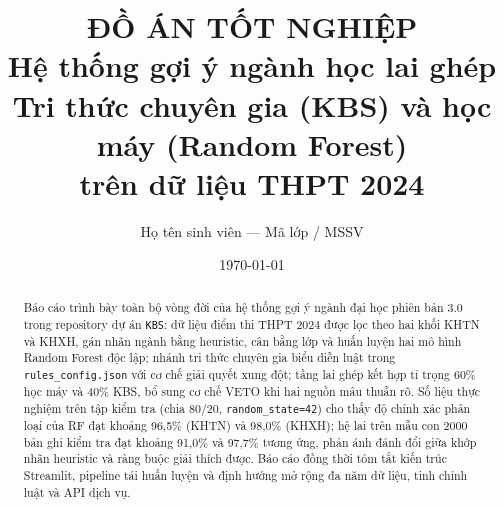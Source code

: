 \documentclass[12pt,a4paper]{report}
\title{\textbf{ĐỒ ÁN TỐT NGHIỆP}\\[0.8em]
\Large Hệ thống gợi ý ngành học lai ghép\\[0.3em]
\normalsize Tri thức chuyên gia (KBS) và học máy (Random Forest)\\trên dữ liệu THPT 2024}
\author{Họ tên sinh viên --- Mã lớp / MSSV}
\date{\today}
\begin{document}
\onehalfspacing

\maketitle
\setcounter{page}{1}


{}
\begin{abstract}
Báo cáo trình bày toàn bộ vòng đời của hệ thống gợi ý ngành đại học phiên bản 3.0 trong repository dự án \texttt{KBS}: dữ liệu điểm thi THPT 2024 được lọc theo hai khối KHTN và KHXH, gán nhãn ngành bằng heuristic, cân bằng lớp và huấn luyện hai mô hình Random Forest độc lập; nhánh tri thức chuyên gia biểu diễn luật trong \texttt{rules\_config.json} với cơ chế giải quyết xung đột; tầng lai ghép kết hợp tỉ trọng 60\% học máy và 40\% KBS, bổ sung cơ chế VETO khi hai nguồn mâu thuẫn rõ. Số liệu thực nghiệm trên tập kiểm tra (chia 80/20, \texttt{random\_state=42}) cho thấy độ chính xác phân loại của RF đạt khoảng 96,5\% (KHTN) và 98,0\% (KHXH); hệ lai trên mẫu con 2000 bản ghi kiểm tra đạt khoảng 91,0\% và 97,7\% tương ứng, phản ánh đánh đổi giữa khớp nhãn heuristic và ràng buộc giải thích được. Báo cáo đồng thời tóm tắt kiến trúc Streamlit, pipeline tái huấn luyện và định hướng mở rộng đa năm dữ liệu, tinh chỉnh luật và API dịch vụ.
\end{abstract}

\tableofcontents
\listoftables
\newpage
{}
\setcounter{page}{1}











\appendix

\end{document}
